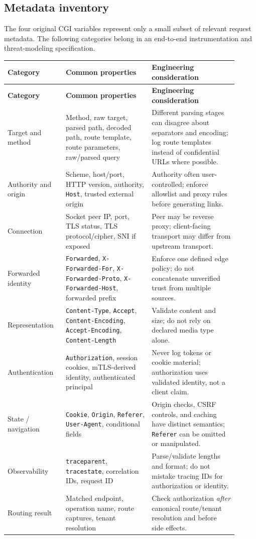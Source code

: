 \documentclass[10pt,letterpaper,oneside]{article}
\newcommand{\code}[1]{\texttt{#1}}
\begin{document}
\subsection{Metadata inventory}
The four original CGI variables represent only a small subset of relevant request metadata. The following categories belong in an end-to-end instrumentation and threat-modeling specification.
\begin{longtable}{P{0.23\linewidth}P{0.34\linewidth}P{0.34\linewidth}}
\toprule
\textbf{Category} & \textbf{Common properties} & \textbf{Engineering consideration}\\\midrule\endfirsthead
\toprule\textbf{Category} & \textbf{Common properties} & \textbf{Engineering consideration}\\\midrule\endhead
Target and method & Method, raw target, parsed path, decoded path, route template, route parameters, raw/parsed query & Different parsing stages can disagree about separators and encoding; log route templates instead of confidential URLs where possible.\\
Authority and origin & Scheme, host/port, HTTP version, authority, \code{Host}, trusted external origin & Authority often user-controlled; enforce allowlist and proxy rules before generating links.\\
Connection & Socket peer IP, port, TLS status, TLS protocol/cipher, SNI if exposed & Peer may be reverse proxy; client-facing transport may differ from upstream transport.\\
Forwarded identity & \code{Forwarded}, \code{X-Forwarded-For}, \code{X-Forwarded-Proto}, \code{X-Forwarded-Host}, forwarded prefix & Enforce one defined edge policy; do not concatenate unverified trust from multiple sources.\\
Representation & \code{Content-Type}, \code{Accept}, \code{Content-Encoding}, \code{Accept-Encoding}, \code{Content-Length} & Validate content and size; do not rely on declared media type alone.\\
Authentication & \code{Authorization}, session cookies, mTLS-derived identity, authenticated principal & Never log tokens or cookie material; authorization uses validated identity, not a client claim.\\
State / navigation & \code{Cookie}, \code{Origin}, \code{Referer}, \code{User-Agent}, conditional fields & Origin checks, CSRF controls, and caching have distinct semantics; \code{Referer} can be omitted or manipulated.\\
Observability & \code{traceparent}, \code{tracestate}, correlation IDs, request ID & Parse/validate lengths and format; do not mistake tracing IDs for authorization or identity.\\
Routing result & Matched endpoint, operation name, route captures, tenant resolution & Check authorization \emph{after} canonical route/tenant resolution and before side effects.\\
\bottomrule
\end{longtable}
\end{document}
